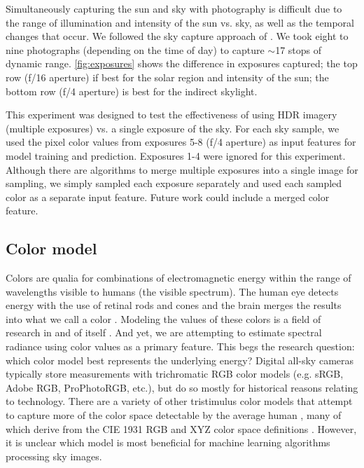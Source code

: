 Simultaneously capturing the sun and sky with photography is difficult due to the range of illumination and intensity of the sun vs. sky, as well as the temporal changes that occur. We followed the sky capture approach of \citet{stumpfel_2004}. We took eight to nine photographs (depending on the time of day) to capture $\mathtt{\sim}$17 stops of dynamic range. \autoref{fig:exposures} shows the difference in exposures captured; the top row (f/16 aperture) if best for the solar region and intensity of the sun; the bottom row (f/4 aperture) is best for the indirect skylight.

This experiment was designed to test the effectiveness of using HDR imagery (multiple exposures) vs. a single exposure of the sky. For each sky sample, we used the pixel color values from exposures 5-8 (f/4 aperture) as input features for model training and prediction. Exposures 1-4 were ignored for this experiment. Although there are algorithms to merge multiple exposures into a single image for sampling, we simply sampled each exposure separately and used each sampled color as a separate input feature. Future work could include a merged color feature.

\subsection{Color model}
\label{ssec:color}

Colors are qualia for combinations of electromagnetic energy within the range of wavelengths visible to humans (the visible spectrum). The human eye detects energy with the use of retinal rods and cones and the brain merges the results into what we call a color \citep{kinney_1958}. Modeling the values of these colors is a field of research in and of itself \citep{koenderink_color}. And yet, we are attempting to estimate spectral radiance using color values as a primary feature. This begs the research question: which color model best represents the underlying energy? Digital all-sky cameras typically store measurements with trichromatic RGB color models (e.g. sRGB, Adobe RGB, ProPhotoRGB, etc.), but do so mostly for historical reasons relating to technology. There are a variety of other tristimulus color models that attempt to capture more of the color space detectable by the average human \citep{poynton_tour, stone_guide}, many of which derive from the CIE 1931 RGB and XYZ color space definitions \citep{wright_cie}. However, it is unclear which model is most beneficial for machine learning algorithms processing sky images.

